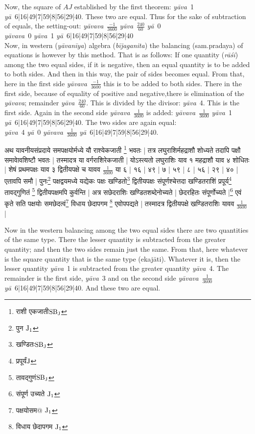 \documentclass[11pt,a5paper]{book}
\def\bijaganita{\textit{b\={\i}ja\-ga\*ni\-ta}}
\def\ya{\textit{y\=a}}
\def\yava{\textit{y\=ava}}
\def\yavava{\textit{y\=avava}}
\def\rasi{\textit{rāśi}}
\def\yavaniya{\textit{y\=avan\=iya}}
\def\bijaganita{\textit{b\=ijaga\*nita}}
\begin{document}
Now, the square of $AJ$ established by the first theorem: \yava\ 1 \ya\ 6|16|49|7|59|8|56|29|40. These two are equal. Thus for the
sake of subtraction of equals, the setting-out:
\yavava\ $\frac{-1}{3600}$ \yava\ $\frac{240}{60}$ \ya\ 0\\
\yavava\ 0 \yava\ 1 \ya\  6|16|49|7|59|8|56|29|40\\

Now, in western (\yavaniya) algebra (\bijaganita) the balancing (sam.pradaya) of equations is however by this method. That is as follows: If one quantity (\rasi) among the two equal sides, if it is negative, then an equal quantity is to be added to both sides. And then in this way, the pair of sides becomes equal. From
that, here in the first side \yavava\ $\frac{-1}{3600}$ this is to be added to both sides. There in the first side,
because of equality of positive and negative,there is elimination of the \yavava; remainder \yava\ $\frac{240}{60}$. This is divided by the divisor: \yava\ 4. This is the first side. Again in the second side \yavava\ $\frac{1}{3600}$ is added: \yavava\  $\frac{1}{3600}$
\yava\ 1 \ya\ 6|16|49|7|59|8|56|29|40. The two sides are again equal:\\
\yava\ 4 \ya\ 0
\yavava\  $\frac{1}{3600}$ \ya\ 6|16|49|7|59|8|56|29|40.

\newpage
{\s अथ यावनीयसंप्रदाये समपक्षयोर्मध्ये यौ
राश्येकजाती \footnote{{\s राशी एकजाती}${\rm SB_J}$} भवतः |
तत्र लघुराशिर्महद्राशौ शोध्यते तदापि पक्षौ समावेावशिष्टौ 
भवतः |
तस्मादत्र या वर्गराशिरेकजाती | योऽस्त्यतो लघुराशिः याव १
महद्राशौ याव ४ शोधितः | शेषं प्रथमपक्षः याव ३
द्वितीयपक्षे च यावव $\frac{1}{3600}$
या ६ | १६ | ४९ | ७ | ५९ | ८ | ५६ | २९ | ४० |
एतावपि समौ |
पुनः\footnote{{\s पुन } ${\rm J_1}$}
पक्षद्वयमध्ये यद्येकः पक्षः खण्डितो\footnote{{\s खण्डितः}${\rm SB_J}$} द्वितीयपक्षः
संपूर्णश्चेत्तदा खण्डितराशिं प्रपूर्य\footnote{{\s प्रपूर्यं}${\rm J}$}
तावद्गुणितं \footnote{{\s तावद्गुणं}${\rm SB_J}$} द्वितीयपक्षमपि
कुर्वन्ति |
अत्र सछेदराशिः खण्डितशब्देनोच्यते |
छेदरहितः संपूर्णोच्यते |\footnote{{\s संपूर्ण उच्यते }${\rm J_1}$}
एवं कृते सति पक्षयोः समछेदत्वं\footnote{{\s पक्षयोसम@ }${\rm J_1}$}
विधाय छेदापगम \footnote{{\s विधाय छेदापगम }${\rm J_1}$}
 एवोपपद्यते |
तस्मादत्र द्वितीयपक्षे 
खण्डितराशिः यावव $\frac{1}{3600}$} |

\newpage
Now in the western balancing among the two equal sides there are two quantities of the same type. There the lesser quantity is subtracted from the greater quantity; and then the two sides
remain just the same. From that, here whatever is the square quantity that is the same type (ekajāti). 
Whatever it is, then the lesser quantity \yava\ 1 is subtracted from the greater quantity \yava\
4. The remainder is the first side, \yava\ 3 and on the second side \yavava\  $\frac{1}{3600}$  \ya\ 6|16|49|7|59|8|56|29|40. 
And these two are equal. 
\end{document}
